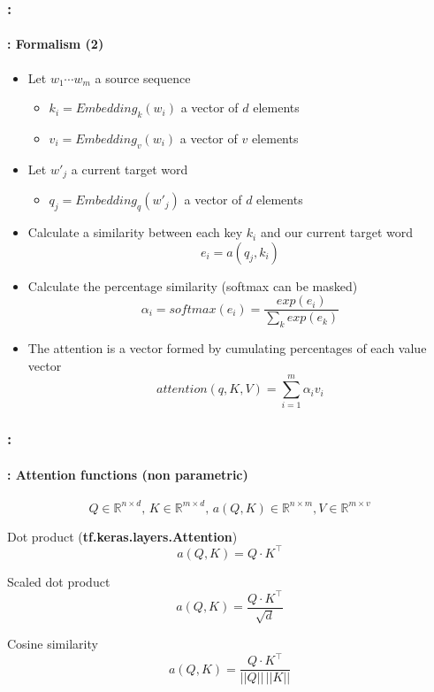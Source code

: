\documentclass[xcolor=table]{beamer}
\begin{document}
\begin{frame}
	\frametitle{\insertshortsubtitle: \insertsection}
	\framesubtitle{\insertsubsection: Formalism (2)}
	
	\begin{itemize}
		\item Let $ w_1 \cdots w_m $ a source sequence
		\begin{itemize}
			\item $ k_i =  Embedding_k(w_i)$ a vector of $ d $ elements
			\item $ v_i =  Embedding_v(w_i)$ a vector of $ v $ elements
		\end{itemize}
		\item Let $ w'_j $ a current target word
		\begin{itemize}
			\item $ q_j =  Embedding_q(w'_j)$ a vector of $ d $ elements
		\end{itemize}
		\item Calculate a similarity between each key $ k_i $ and our current target word 
		\[e_i = a(q_j, k_i)\]
		\item Calculate the percentage similarity (softmax can be masked)
		\[\alpha_i = softmax(e_i) = \frac{exp(e_i)}{\sum_k exp(e_k)}\] 
		\item The attention is a vector formed by cumulating percentages of each value vector
		\vspace{-6pt}\[attention(q, K, V) = \sum_{i=1}^{m} \alpha_i v_i\]
	\end{itemize}
	
\end{frame}

%	
%	


\begin{frame}
	\frametitle{\insertshortsubtitle: \insertsection}
	\framesubtitle{\insertsubsection: Attention functions (non parametric)}
	
	\[Q \in \mathbb{R}^{n \times d}, \, K \in \mathbb{R}^{m \times d}, \, a(Q, K) \in \mathbb{R}^{n \times m}, V \in \mathbb{R}^{m \times v} \]
	
	\vspace{12pt}
	
	Dot product (\textbf{tf.keras.layers.Attention})
	\[a(Q, K) = Q \cdot K^\top\]
	
	Scaled dot product 
	\[a(Q, K) = \frac{Q \cdot K^\top}{\sqrt{d}}\]
	
	Cosine similarity
	\[a(Q, K) = \frac{Q \cdot K^\top}{||Q|| \, ||K||}\]
	
\end{frame}
\end{document}
